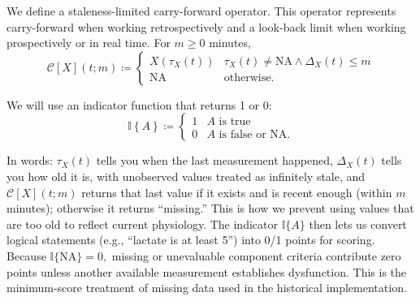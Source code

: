 \documentclass[letterpaper,10pt]{article}
\begin{document}
We define a staleness-limited carry-forward operator. This operator represents
carry-forward when working retrospectively and a look-back limit when working
prospectively or in real time. For $m \geq 0$ minutes,
\begin{equation}
  \label{eq:carry-forward}
  \mathcal{C}\left[X\right](t;m)\coloneqq
    \begin{cases}
      X\left(\tau_{X}(t)\right) &
      \tau_{X}(t) \neq \mathrm{NA} \wedge \Delta_{X}(t) \leq m \\
      \mathrm{NA} & \text{otherwise.}
    \end{cases}
\end{equation}

We will use an indicator function that returns 1 or 0:
\begin{equation}
  \label{eq:indicator}
  \mathbb{I}\left\{A\right\} \coloneqq
    \begin{cases}
      1 & A \text{ is true} \\
      0 & A \text{ is false or } \mathrm{NA}.
    \end{cases}
\end{equation}

In words: $\tau_X(t)$ tells you when the last measurement happened,
$\Delta_X(t)$ tells you how old it is, with unobserved values treated as
infinitely stale, and $\mathcal{C}[X](t;m)$ returns that last value if it
exists and is recent enough (within $m$ minutes); otherwise it returns
``missing.'' This is how we prevent using values that are too old to
reflect current physiology. The indicator
$\mathbb{I}\{A\}$ then lets us convert logical statements (e.g.,
``lactate is at least 5'') into 0/1 points for scoring.
Because $\mathbb{I}\{\mathrm{NA}\}=0,$ missing or unevaluable component
criteria contribute zero points unless another available measurement establishes
dysfunction. This is the minimum-score treatment of missing data used in the
historical implementation.
\end{document}
